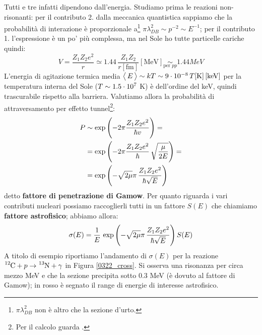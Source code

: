 Tutti e tre infatti dipendono dall'energia. Studiamo prima le reazioni non-risonanti: per il contributo 2. dalla meccanica quantistica sappiamo che la probabilità di interazione è proporzionale a\footnote{$\pi\lambda_{DB}^2$ non è altro che la sezione d'urto.} $\pi \lambda^2_{DB}\sim p^{-2} \sim E^{-1}$; per il contributo 1. l'espressione è un po' più complessa, ma nel Sole ho tutte particelle cariche quindi:
$$V = \frac{Z_1 Z_2 e^2}{r} \simeq 1.44 \, \frac{Z_1Z_2}{r[\mbox{fm}]} [\mbox{MeV}] \underset{\text{per }pp}{\sim} 1.44\unit{MeV}$$
L'energia di agitazione termica media $\bigl\langle\, E\, \bigr\rangle\sim kT \sim 9\cdot10^{-8} \, T[\mbox{K}]\,[\mbox{keV}]$ per la temperatura interna del Sole ($T\sim 1.5\cdot10^{7}$ K) è dell'ordine del keV, quindi trascurabile rispetto alla barriera. Valutiamo allora la probabilità di attraversamento per effetto tunnel\footnote{Per il calcolo guarda .}:\label{sec-tunnel}
\begin{displaymath}
\begin{aligned}
P &\sim \exp{\Biggl ( -2\pi \frac{Z_1Z_2 e^2}{\hbar v} \Biggr )} =\\
&= \exp{\Biggl ( -2\pi \frac{Z_1Z_2 e^2}{\hbar}\, \sqrt{\frac{\mu}{2E}} \Biggr )} =\\
&= \exp{\Biggl ( -\sqrt{2\mu}\pi\, \frac{Z_1Z_2 e^2}{\hbar \sqrt{E}} \Biggr )} 
\end{aligned}
\end{displaymath}
detto \textbf{fattore di penetrazione di Gamow}. Per quanto riguarda i vari contributi nucleari possiamo raccoglierli tutti in un fattore $S(E)$ che chiamiamo \textbf{fattore astrofisico}; abbiamo allora:
$$\sigma (E) = \frac{1}{E}\,\exp{\Biggl ( -\sqrt{2\mu}\pi\, \frac{Z_1Z_2 e^2}{\hbar \sqrt{E}} \Biggr )}\, S(E)$$
\noindent A titolo di esempio riportiamo l'andamento di $\sigma(E)$ per la reazione $\ce{^{12}C}+p\to \ce{^{13}N}+\gamma$ in Figura \ref{0322_cross}. Si osserva una risonanza per circa mezzo MeV e che la sezione precipita sotto 0.3 MeV (è dovuto al fattore di Gamow); in rosso è segnato il range di energie di interesse astrofisico.

